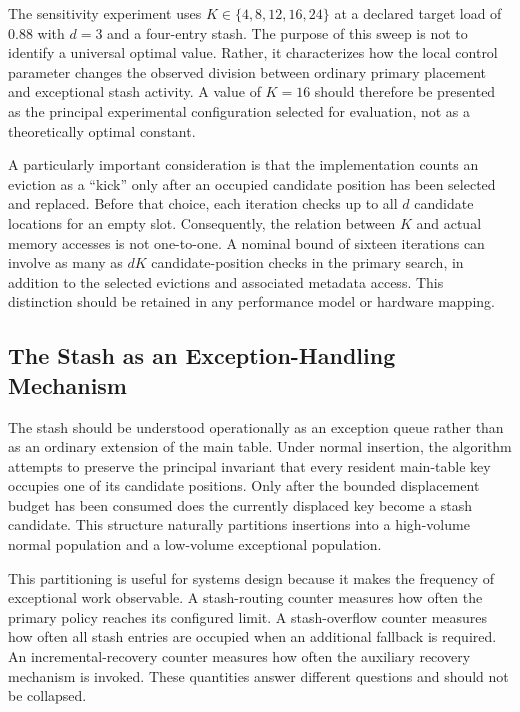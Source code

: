 \documentclass[conference]{IEEEtran}
\begin{document}
The sensitivity experiment uses $K\in\{4,8,12,16,24\}$ at a declared target
load of $0.88$ with $d=3$ and a four-entry stash. The purpose of this sweep is
not to identify a universal optimal value. Rather, it characterizes how the
local control parameter changes the observed division between ordinary
primary placement and exceptional stash activity. A value of $K=16$ should
therefore be presented as the principal experimental configuration selected
for evaluation, not as a theoretically optimal constant.

A particularly important consideration is that the implementation counts an
eviction as a ``kick'' only after an occupied candidate position has been
selected and replaced. Before that choice, each iteration checks up to all
$d$ candidate locations for an empty slot. Consequently, the relation between
$K$ and actual memory accesses is not one-to-one. A nominal bound of sixteen
iterations can involve as many as $dK$ candidate-position checks in the primary
search, in addition to the selected evictions and associated metadata access.
This distinction should be retained in any performance model or hardware
mapping.

\subsection{The Stash as an Exception-Handling Mechanism}
\label{subsec:discussion_stash_role}

The stash should be understood operationally as an exception queue rather than
as an ordinary extension of the main table. Under normal insertion, the
algorithm attempts to preserve the principal invariant that every resident
main-table key occupies one of its candidate positions. Only after the bounded
displacement budget has been consumed does the currently displaced key become
a stash candidate. This structure naturally partitions insertions into a
high-volume normal population and a low-volume exceptional population.

This partitioning is useful for systems design because it makes the frequency
of exceptional work observable. A stash-routing counter measures how often the
primary policy reaches its configured limit. A stash-overflow counter measures
how often all stash entries are occupied when an additional fallback is
required. An incremental-recovery counter measures how often the auxiliary
recovery mechanism is invoked. These quantities answer different questions and
should not be collapsed.
\end{document}
